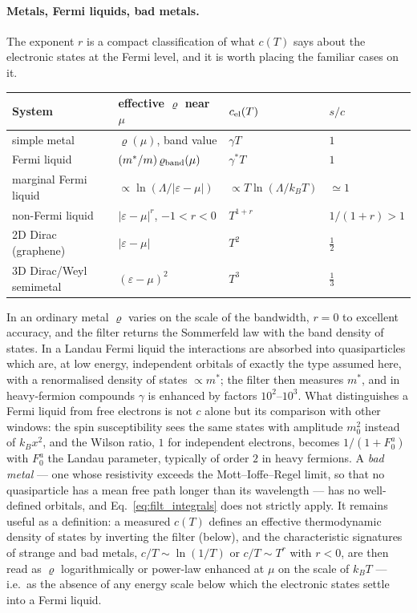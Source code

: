 \documentclass[10pt,a4paper]{article}
\theoremstyle{plain}
\theoremstyle{remark}
\begin{document}
\paragraph{Metals, Fermi liquids, bad metals.} The exponent $ r $ is a compact
classification of what $ c(T) $ says about the electronic states at the Fermi
level, and it is worth placing the familiar cases on it.
\begin{center}
\small
\begin{tabular}{llll}
\toprule
System & effective $ \varrho $ near $ \mu $ & $ c_{\rm el}(T) $ & $ s/c $ \\
\midrule
simple metal & $ \varrho(\mu) $, band value & $ \gamma T $ & $ 1 $ \\
Fermi liquid & $ (m^\ast/m)\,\varrho_{\rm band}(\mu) $ & $ \gamma^\ast T $ & $ 1 $ \\
marginal Fermi liquid & $ \propto\ln(\Lambda/|\varepsilon-\mu|) $ & $ \propto T\ln(\Lambda/k_BT) $ & $ \simeq 1 $ \\
non-Fermi liquid & $ |\varepsilon-\mu|^{r} $, $ -1<r<0 $ & $ T^{1+r} $ & $ 1/(1+r) > 1 $ \\
2D Dirac (graphene) & $ |\varepsilon-\mu| $ & $ T^{2} $ & $ \tfrac12 $ \\
3D Dirac/Weyl semimetal & $ (\varepsilon-\mu)^{2} $ & $ T^{3} $ & $ \tfrac13 $ \\
\bottomrule
\end{tabular}
\end{center}
In an ordinary metal $ \varrho $ varies on the scale of the bandwidth, $ r = 0 $ to
excellent accuracy, and the filter returns the Sommerfeld law with the band
density of states. In a Landau Fermi liquid the interactions are absorbed into
quasiparticles which are, at low energy, independent orbitals of exactly the type
assumed here, with a renormalised density of states $ \propto m^\ast $; the filter
then measures $ m^\ast $, and in heavy-fermion compounds $ \gamma $ is enhanced by
factors $ 10^{2} $--$ 10^{3} $. What distinguishes a Fermi liquid from free electrons
is not $ c $ alone but its comparison with other windows: the spin susceptibility
sees the same states with amplitude $ m_0^{2} $ instead of $ k_Bx^{2} $, and the
Wilson ratio, $ 1 $ for independent electrons, becomes $ 1/(1 + F_0^{a}) $ with
$ F_0^{a} $ the Landau parameter, typically of order $ 2 $ in heavy fermions. A
\emph{bad metal} --- one whose resistivity exceeds the Mott--Ioffe--Regel limit, so
that no quasiparticle has a mean free path longer than its wavelength --- has no
well-defined orbitals, and Eq.~\eqref{eq:filt_integrals} does not strictly apply.
It remains useful as a definition: a measured $ c(T) $ defines an effective
thermodynamic density of states by inverting the filter (below), and the
characteristic signatures of strange and bad metals, $ c/T \sim \ln(1/T) $ or
$ c/T \sim T^{r} $ with $ r < 0 $, are then read as $ \varrho $ logarithmically or
power-law enhanced at $ \mu $ on the scale of $ k_BT $ --- i.e.\ as the absence of any
energy scale below which the electronic states settle into a Fermi liquid.
\end{document}
